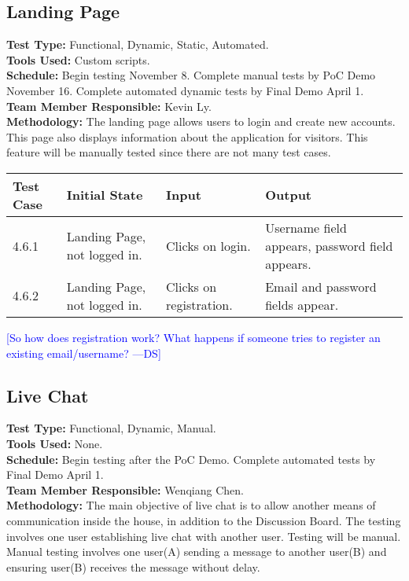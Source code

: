\documentclass[12pt]{article}
\newcommand{\authornote}[3]{\textcolor{#1}{[#3 ---#2]}}
\newcommand{\authornote}[3]{}
\newcommand{\ds}[1]{\authornote{blue}{DS}{#1}}
\begin{document}
\subsection{Landing Page}
\textbf{Test Type:} Functional, Dynamic, Static, Automated. \\
\textbf{Tools Used:} Custom scripts. \\
\textbf{Schedule:} Begin testing November 8. Complete manual tests by PoC Demo November 16. Complete automated dynamic tests by Final Demo April 1. \\
\textbf{Team Member Responsible:} Kevin Ly.\\
\textbf{Methodology:} The landing page allows users to login and create new accounts. This page also displays information about the application for visitors. This feature will be manually tested since there are not many test cases.

\begin{longtable}{|p{2cm}|p{3cm}|p{5cm}|p{5cm}|}
\hline
\textbf{Test Case}  & \textbf{Initial State} & \textbf{Input} & \textbf{Output} \\ \hline
4.6.1 & Landing Page, not logged in. & Clicks on login. & Username field appears, password field appears.\\
\hline
4.6.2 & Landing Page, not logged in. & Clicks on registration. & Email and password fields appear.\\
\hline
\end{longtable}

\ds{So how does registration work? What happens if someone tries to register an existing email/username?}

\subsection{Live Chat}
\textbf{Test Type:} Functional, Dynamic, Manual. \\
\textbf{Tools Used:} None. \\
\textbf{Schedule:} Begin testing after the PoC Demo. Complete automated tests by Final Demo April 1. \\
\textbf{Team Member Responsible:} Wenqiang Chen.\\
\textbf{Methodology:} The main objective of live chat is to allow another means of communication inside the house, in addition to the Discussion Board. The testing involves one user establishing live chat with another user. Testing will be manual. Manual testing involves one user(A) sending a message to another user(B) and ensuring user(B) receives the message without delay. 
\end{document}
